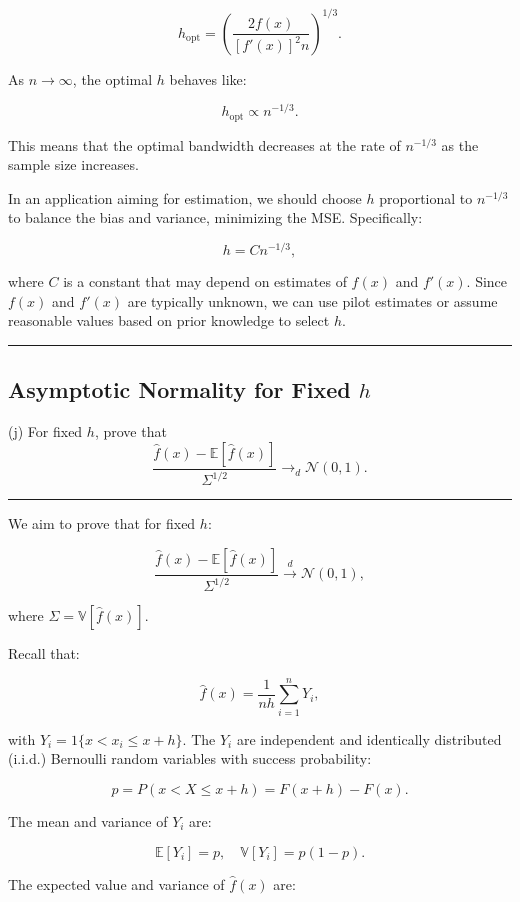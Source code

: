 \documentclass{article}
\newenvironment{colorparagraph}[1]{\par\color{#1}}{\par}
\begin{document}
\[
h_{\text{opt}} = \left( \frac{2 f(x)}{[f'(x)]^2 n} \right)^{1/3}.
\]

As \( n \to \infty \), the optimal \( h \) behaves like:

\[
h_{\text{opt}} \propto n^{-1/3}.
\]

This means that the optimal bandwidth decreases at the rate of \( n^{-1/3} \) as the sample size increases.

In an application aiming for estimation, we should choose \( h \) proportional to \( n^{-1/3} \) to balance the bias and variance, minimizing the MSE. Specifically:

\[
h = C n^{-1/3},
\]

where \( C \) is a constant that may depend on estimates of \( f(x) \) and \( f'(x) \). Since \( f(x) \) and \( f'(x) \) are typically unknown, we can use pilot estimates or assume reasonable values based on prior knowledge to select \( h \).

\begin{colorparagraph}{questioncolor}
\label{q2j}
\rule{\textwidth}{0.5pt}
\subsection{Asymptotic Normality for Fixed \( h \)}
(j) For fixed \( h \), prove that
\[
\frac{\hat{f}(x) - \mathbb{E}[\hat{f}(x)]}{\Sigma^{1/2}} \to_d \mathcal{N}(0, 1).
\]

\rule{\textwidth}{0.5pt}
\end{colorparagraph}

We aim to prove that for fixed \( h \):

\[
\frac{\hat{f}(x) - \mathbb{E}[\hat{f}(x)]}{\Sigma^{1/2}} \xrightarrow{d} \mathcal{N}(0, 1),
\]

where \(\Sigma = \mathbb{V}[\hat{f}(x)]\).

Recall that:

\[
\hat{f}(x) = \frac{1}{n h} \sum_{i=1}^n Y_i,
\]

with \( Y_i = 1\{ x < x_i \leq x + h \} \). The \( Y_i \) are independent and identically distributed (i.i.d.) Bernoulli random variables with success probability:

\[
p = P(x < X \leq x + h) = F(x + h) - F(x).
\]

The mean and variance of \( Y_i \) are:

\[
\mathbb{E}[Y_i] = p, \quad \mathbb{V}[Y_i] = p (1 - p).
\]

The expected value and variance of \( \hat{f}(x) \) are:
\end{document}
